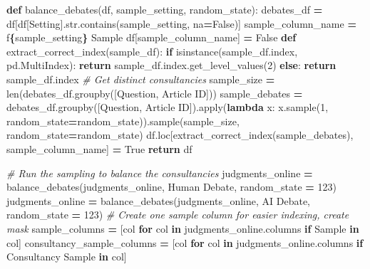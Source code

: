 \documentclass[
]{article}
\newenvironment{Shaded}{\begin{snugshade}}{\end{snugshade}}
\newcommand{\BuiltInTok}[1]{#1}
\newcommand{\CommentTok}[1]{\textcolor[rgb]{0.56,0.35,0.01}{\textit{#1}}}
\newcommand{\ControlFlowTok}[1]{\textcolor[rgb]{0.13,0.29,0.53}{\textbf{#1}}}
\newcommand{\DecValTok}[1]{\textcolor[rgb]{0.00,0.00,0.81}{#1}}
\newcommand{\KeywordTok}[1]{\textcolor[rgb]{0.13,0.29,0.53}{\textbf{#1}}}
\newcommand{\NormalTok}[1]{#1}
\newcommand{\OperatorTok}[1]{\textcolor[rgb]{0.81,0.36,0.00}{\textbf{#1}}}
\newcommand{\SpecialCharTok}[1]{\textcolor[rgb]{0.81,0.36,0.00}{\textbf{#1}}}
\newcommand{\SpecialStringTok}[1]{\textcolor[rgb]{0.31,0.60,0.02}{#1}}
\newcommand{\StringTok}[1]{\textcolor[rgb]{0.31,0.60,0.02}{#1}}
\newcommand{\VariableTok}[1]{\textcolor[rgb]{0.00,0.00,0.00}{#1}}
\begin{document}
\begin{Shaded}
\begin{Highlighting}[]
\KeywordTok{def}\NormalTok{ balance\_debates(df, sample\_setting, random\_state):}
\NormalTok{    debates\_df }\OperatorTok{=}\NormalTok{ df[df[}\StringTok{\textquotesingle{}Setting\textquotesingle{}}\NormalTok{].}\BuiltInTok{str}\NormalTok{.contains(sample\_setting, na}\OperatorTok{=}\VariableTok{False}\NormalTok{)]}
\NormalTok{    sample\_column\_name }\OperatorTok{=} \SpecialStringTok{f\textquotesingle{}}\SpecialCharTok{\{}\NormalTok{sample\_setting}\SpecialCharTok{\}}\SpecialStringTok{ Sample\textquotesingle{}}
\NormalTok{    df[sample\_column\_name] }\OperatorTok{=} \VariableTok{False}
    \KeywordTok{def}\NormalTok{ extract\_correct\_index(sample\_df):}
        \ControlFlowTok{if} \BuiltInTok{isinstance}\NormalTok{(sample\_df.index, pd.MultiIndex):}
            \ControlFlowTok{return}\NormalTok{ sample\_df.index.get\_level\_values(}\DecValTok{2}\NormalTok{)}
        \ControlFlowTok{else}\NormalTok{:}
            \ControlFlowTok{return}\NormalTok{ sample\_df.index}
    \CommentTok{\# Get distinct consultancies}
\NormalTok{    sample\_size }\OperatorTok{=} \BuiltInTok{len}\NormalTok{(debates\_df.groupby([}\StringTok{\textquotesingle{}Question\textquotesingle{}}\NormalTok{, }\StringTok{\textquotesingle{}Article ID\textquotesingle{}}\NormalTok{]))}
\NormalTok{    sample\_debates }\OperatorTok{=}\NormalTok{ debates\_df.groupby([}\StringTok{\textquotesingle{}Question\textquotesingle{}}\NormalTok{, }\StringTok{\textquotesingle{}Article ID\textquotesingle{}}\NormalTok{]).}\BuiltInTok{apply}\NormalTok{(}\KeywordTok{lambda}\NormalTok{ x: x.sample(}\DecValTok{1}\NormalTok{, random\_state}\OperatorTok{=}\NormalTok{random\_state)).sample(sample\_size, random\_state}\OperatorTok{=}\NormalTok{random\_state)}
\NormalTok{    df.loc[extract\_correct\_index(sample\_debates), sample\_column\_name] }\OperatorTok{=} \VariableTok{True}
    \ControlFlowTok{return}\NormalTok{ df}

\CommentTok{\# Run the sampling to balance the consultancies}
\NormalTok{judgments\_online }\OperatorTok{=}\NormalTok{ balance\_debates(judgments\_online, }\StringTok{\textquotesingle{}Human Debate\textquotesingle{}}\NormalTok{, random\_state }\OperatorTok{=} \DecValTok{123}\NormalTok{)}
\NormalTok{judgments\_online }\OperatorTok{=}\NormalTok{ balance\_debates(judgments\_online, }\StringTok{\textquotesingle{}AI Debate\textquotesingle{}}\NormalTok{, random\_state }\OperatorTok{=} \DecValTok{123}\NormalTok{)}
\CommentTok{\# Create one sample column for easier indexing, create mask}
\NormalTok{sample\_columns }\OperatorTok{=}\NormalTok{ [col }\ControlFlowTok{for}\NormalTok{ col }\KeywordTok{in}\NormalTok{ judgments\_online.columns }\ControlFlowTok{if} \StringTok{\textquotesingle{}Sample\textquotesingle{}} \KeywordTok{in}\NormalTok{ col]}
\NormalTok{consultancy\_sample\_columns }\OperatorTok{=}\NormalTok{ [col }\ControlFlowTok{for}\NormalTok{ col }\KeywordTok{in}\NormalTok{ judgments\_online.columns }\ControlFlowTok{if} \StringTok{\textquotesingle{}Consultancy Sample\textquotesingle{}} \KeywordTok{in}\NormalTok{ col]}


\end{Highlighting}
\end{Shaded}
\end{document}

